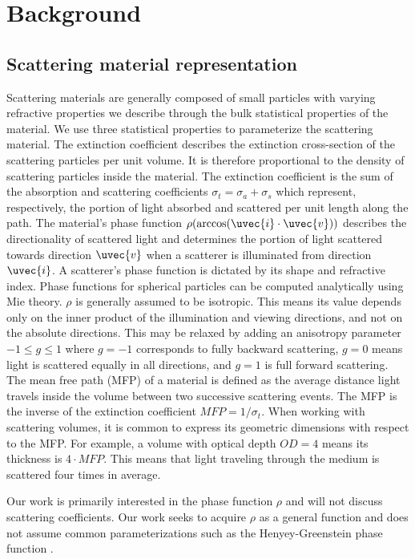 \section{Background}

\subsection{Scattering material representation}
Scattering materials are generally composed of small particles with varying refractive properties we describe through the bulk statistical properties of the material. We use three statistical properties to parameterize the scattering material. The extinction coefficient describes the extinction cross-section of the scattering particles per unit volume. It is therefore proportional to the density of scattering particles inside the material. The extinction coefficient is the sum of the absorption and scattering coefficients $\sigma_t = \sigma_a + \sigma_s$ which represent, respectively, the portion of light absorbed and scattered per unit length along the path. The material's phase function $\rho(\arccos(\uvec{i} \cdot \uvec{v}))$ describes the directionality of scattered light and determines the portion of light scattered towards direction $\uvec{v}$ when a scatterer is illuminated from direction $\uvec{i}$. A scatterer's phase function is dictated by its shape and refractive index. Phase functions for spherical particles can be computed analytically using Mie theory\cite{bohren2008absorption, frisvad2007computing, hulst1981light}. $\rho$ is generally assumed to be isotropic. This means its value depends only on the inner product of the illumination and viewing directions, and not on the absolute directions. This may be relaxed by adding an anisotropy parameter $-1 \leq g \leq 1$ where $g=-1$ corresponds to fully backward scattering, $g=0$ means light is scattered equally in all directions, and $g=1$ is full forward scattering. The mean free path (MFP) of a material is defined as the average distance light travels inside the volume between two successive scattering events. The MFP is the inverse of the extinction coefficient $MFP=1/\sigma_t$. When working with scattering volumes, it is common to express its geometric dimensions with respect to the MFP. For example, a volume with optical depth $OD = 4$ means its thickness is $4 \cdot MFP$. This means that light traveling through the medium is scattered four times in average.

Our work is primarily interested in the phase function $\rho$ and will not discuss scattering coefficients. Our work seeks to acquire $\rho$ as a general function and does not assume common parameterizations such as the Henyey-Greenstein phase function \cite{henyey1940diffuse}.

